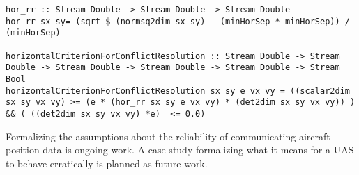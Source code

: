 %
%
%
%
\begin{lstlisting}[frame=single]
hor_rr :: Stream Double -> Stream Double -> Stream Double
hor_rr sx sy= (sqrt $ (normsq2dim sx sy) - (minHorSep * minHorSep)) / (minHorSep)

horizontalCriterionForConflictResolution :: Stream Double -> Stream Double -> Stream Double -> Stream Double -> Stream Double -> Stream Bool
horizontalCriterionForConflictResolution sx sy e vx vy = ((scalar2dim sx sy vx vy) >= (e * (hor_rr sx sy e vx vy) * (det2dim sx sy vx vy)) ) && ( ((det2dim sx sy vx vy) *e)  <= 0.0)
\end{lstlisting}

Formalizing the assumptions about the reliability of communicating
aircraft position data is ongoing work.  A case study formalizing what
it means for a UAS to behave erratically is planned as future
work.  


%
%
%



